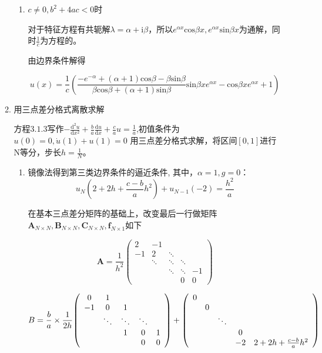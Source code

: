 \documentclass{ctexart}
\begin{document}
\begin{enumerate}
\begin{enumerate}
\begin{enumerate}
\item \( c \neq 0 , b^2+4ac < 0\)时

对于特征方程有共轭解\(\lambda=\alpha+\mbox{i} \beta\)，所以\(e^{\alpha x} \mbox{cos} \beta x, e^{\alpha x} \mbox{sin} \beta x\)为通解，同时\(\frac{1}{c}\)为方程的。

由边界条件解得

\[
u(x)=\frac{1}{c}(\frac{-e^{-\alpha}+(\alpha+1) \mbox{cos} \beta -\beta \mbox{sin}\beta}{\beta \mbox{cos}\beta +(\alpha+1) \mbox{sin} \beta} \mbox{sin} \beta x e^{\alpha x}-\mbox{cos}\beta x e^{\alpha x}+1)
\]
\end{enumerate}

\item  用三点差分格式离散求解

方程\(3.1.3\)写作\(-\frac{\mbox{d}^2u}{\mbox{d}x^2}+\frac{b}{a} \frac{\mbox{d}u}{\mbox{d}x}+\frac{c}{a}u=\frac{1}{a} \),初值条件为\(u(0)=0,\dot{u}(1)+u(1)=0\)
用三点差分格式求解，将区间\([0,1]\)进行N等分，步长\(h=\frac{1}{N}\)。

\begin{enumerate}
\item 镜像法得到第三类边界条件的逼近条件, 其中，\(\alpha=1,g=0\)：
 \[
u_N(2+2h+\frac{c-b}{a}h^2)+u_{N-1}(-2)=\frac{h^2}{a}
 \]

 
在基本三点差分矩阵的基础上，改变最后一行做矩阵\(\bm{A}_{N\times N},\bm{B}_{N\times N},\bm{C}_{N\times N},\bm{f}_{N\times 1}\)如下

\begin{equation*}
\bm{A}=\frac{1}{h^2}{
\left ( \begin{array}{ccccc}
2 & -1 &  & &  \\
-1& 2 & \ddots & & \\
  & \ddots & \ddots &\ddots & \\
  & &\ddots &\ddots &-1\\
  &  & &0 &0
\end{array} 
\right )}
\end{equation*}
 
 \begin{equation*}
B = \frac{b}{a}\times\frac{1}{2h}{
\left ( \begin{array}{ccccc}
0 & 1 &  & &  \\
-1& 0 & 1 & & \\
  & \ddots & \ddots &\ddots & \\
  & &\-1 &0 &1\\
  &  & &0 &0
\end{array} 
\right )}
+{
\left ( \begin{array}{ccccc}
 0&  &  & &  \\
&0  & & & \\
  & & \ddots & & \\
  & &\ &0 &\\
  &  & &-2&2+2h+\frac{c-b}{a}h^2
\end{array} 
\right )}
\end{equation*}


\end{enumerate}
\end{enumerate}
\end{enumerate}
\end{document}
